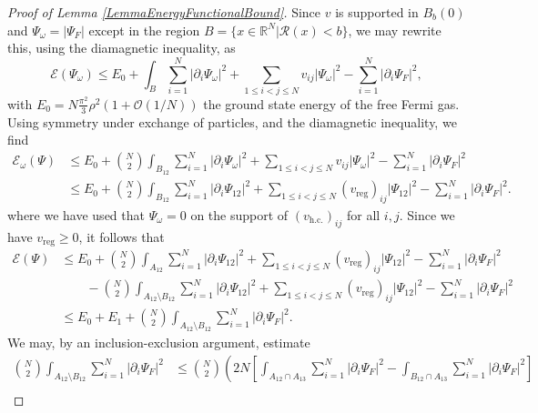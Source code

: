 \documentclass[a4paper,11pt]{article}
\newcommand{\abs}[1]{\left\lvert #1 \right\rvert}
\newcommand{\R}{\mathbb{R}}
\newcommand{\rr}{\mathcal{R}}
\numberwithin{equation}{section}
\begin{document}
	\begin{proof}[Proof of Lemma \ref{LemmaEnergyFunctionalBound}]
		Since $ v $ is supported in $ B_b(0) $ and $ \Psi_\omega=\abs{\Psi_F} $ except in the region $ B=\{x\in\R^N \vert \rr(x)<b \} $, we may rewrite this, using the diamagnetic inequality, as \begin{equation}
		\mathcal{E}(\Psi_\omega)\leq E_0+\int_B \sum_{i=1}^{N}\abs{\partial_i\Psi_\omega}^2+\sum_{1\leq i<j\leq N}v_{ij}\abs{\Psi_\omega}^2-\sum_{i=1}^{N}\abs{\partial_i\Psi_F}^2,
		\end{equation}
		with $ E_0=N\frac{\pi^2}{3}\rho^2(1+\mathcal{O}(1/N)) $ the ground state energy of the free Fermi gas. Using symmetry under exchange of particles, and the diamagnetic inequality, we find \begin{equation}
		\begin{aligned}
		\mathcal{E_\omega}(\Psi)&\leq E_0+\binom{N}{2}\int_{B_{12}} \sum_{i=1}^{N}\abs{\partial_i\Psi_\omega}^2+\sum_{1\leq i<j\leq N}v_{ij}\abs{\Psi_\omega}^2-\sum_{i=1}^{N}\abs{\partial_i\Psi_F}^2\\&
		\leq E_0+\binom{N}{2}\int_{B_{12}} \sum_{i=1}^{N}\abs{\partial_i\Psi_{12}}^2+\sum_{1\leq i<j\leq N}(v_{\text{reg}})_{ij}\abs{\Psi_{12}}^2-\sum_{i=1}^{N}\abs{\partial_i\Psi_F}^2.
		\end{aligned}
		\end{equation}
		where we have used that $ \Psi_\omega=0 $ on the support of $ (v_{\text{h.c.}})_{ij} $ for all $ i,j $. Since we have $ v_{\text{reg}}\geq0 $, it follows that
		\begin{equation}
		\begin{aligned}
		\mathcal{E}(\Psi)&\leq E_0+\binom{N}{2}\int_{A_{12}} \sum_{i=1}^{N}\abs{\partial_i\Psi_{12}}^2+\sum_{1\leq i<j\leq N}(v_{\text{reg}})_{ij}\abs{\Psi_{12}}^2-\sum_{i=1}^{N}\abs{\partial_i\Psi_F}^2\\&\qquad
		-\binom{N}{2}\int_{A_{12}\setminus B_{12}} \sum_{i=1}^{N}\abs{\partial_i\Psi_{12}}^2+\sum_{1\leq i<j\leq N}(v_{\text{reg}})_{ij}\abs{\Psi_{12}}^2-\sum_{i=1}^{N}\abs{\partial_i\Psi_F}^2\\&
		\leq E_0+E_1+\binom{N}{2}\int_{A_{12}\setminus B_{12}}\sum_{i=1}^{N}\abs{\partial_i\Psi_F}^2.
		\end{aligned}
		\end{equation}	
		We may, by an inclusion-exclusion argument, estimate\begin{equation}
		\begin{aligned}
		\binom{N}{2}\int_{A_{12}\setminus B_{12}}\sum_{i=1}^{N}\abs{\partial_i\Psi_F}^2&\leq \binom{N}{2}\left(2N\left[\int_{A_{12}\cap A_{13}}\sum_{i=1}^{N}\abs{\partial_i\Psi_F}^2-\int_{B_{12}\cap A_{13}}\sum_{i=1}^{N}\abs{\partial_i\Psi_F}^2\right]\right.\\

\end{aligned}
\end{equation}
\end{proof}
\end{document}
